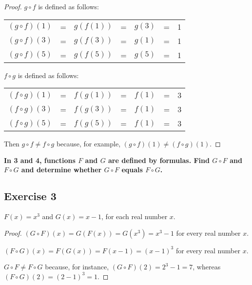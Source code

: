 \documentclass[14pt]{extarticle}
\newcommand{\cy}{\color{cyan}}
\begin{document}
\begin{proof}
    \(g \circ f\) is defined as follows:

    \begin{center}
        \begin{tabular}{ccccccc}
            \((g \circ f)(1)\) & = & \(g(f(1))\) & = & \(g(3)\) & = & 1 \\
            \((g \circ f)(3)\) & = & \(g(f(3))\) & = & \(g(1)\) & = & 1 \\
            \((g \circ f)(5)\) & = & \(g(f(5))\) & = & \(g(5)\) & = & 1 \\
        \end{tabular}
    \end{center}

    \(f \circ g\) is defined as follows:

    \begin{center}
        \begin{tabular}{ccccccc}
            \((f \circ g)(1)\) & = & \(f(g(1))\) & = & \(f(1)\) & = & 3 \\
            \((f \circ g)(3)\) & = & \(f(g(3))\) & = & \(f(1)\) & = & 3 \\
            \((f \circ g)(5)\) & = & \(f(g(5))\) & = & \(f(1)\) & = & 3 \\
        \end{tabular}
    \end{center}

    Then \(g \circ f \neq f \circ g\) because, for example, \((g \circ f)(1) \neq (f \circ g)(1)\).
\end{proof}

{\bf \cy In 3 and 4, functions $F$ and $G$ are defined by formulas. Find \(G \circ F\) and \(F \circ G\) and
determine whether \(G \circ F\) equals \(F \circ G\).}

\subsection{Exercise 3}
\(F(x) = x^3\) and \(G(x) = x - 1\), for each real number $x$.

\begin{proof}
    \((G \circ F)(x) = G(F(x)) = G(x^3) = x^3 - 1\) for every real number $x$.

    \((F \circ G)(x) = F(G(x)) = F(x - 1) = (x - 1)^3\) for every real number $x$.

    \(G \circ F \neq F \circ G\) because, for instance, \((G \circ F)(2) = 2^3 - 1 = 7\),
    whereas \((F \circ G)(2) = (2 - 1)^3 = 1\).
\end{proof}
\end{document}
